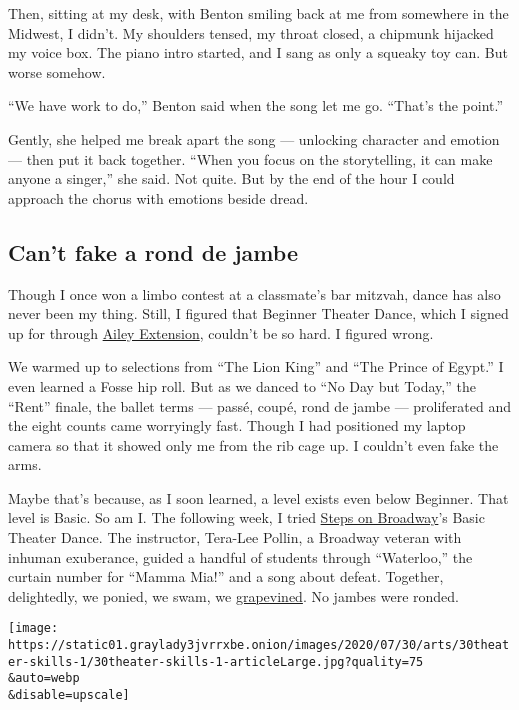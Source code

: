 Then, sitting at my desk, with Benton smiling back at me from somewhere
in the Midwest, I didn't. My shoulders tensed, my throat closed, a
chipmunk hijacked my voice box. The piano intro started, and I sang as
only a squeaky toy can. But worse somehow.

``We have work to do,'' Benton said when the song let me go. ``That's
the point.''

Gently, she helped me break apart the song --- unlocking character and
emotion --- then put it back together. ``When you focus on the
storytelling, it can make anyone a singer,'' she said. Not quite. But by
the end of the hour I could approach the chorus with emotions beside
dread.

\hypertarget{cant-fake-a-rond-de-jambe}{%
\subsection{Can't fake a rond de
jambe}\label{cant-fake-a-rond-de-jambe}}

Though I once won a limbo contest at a classmate's bar mitzvah, dance
has also never been my thing. Still, I figured that Beginner Theater
Dance, which I signed up for through
\href{https://www.aileyextension.com/}{Ailey Extension}, couldn't be so
hard. I figured wrong.

We warmed up to selections from ``The Lion King'' and ``The Prince of
Egypt.'' I even learned a Fosse hip roll. But as we danced to ``No Day
but Today,'' the ``Rent'' finale, the ballet terms --- passé, coupé,
rond de jambe --- proliferated and the eight counts came worryingly
fast. Though I had positioned my laptop camera so that it showed only me
from the rib cage up. I couldn't even fake the arms.

Maybe that's because, as I soon learned, a level exists even below
Beginner. That level is Basic. So am I. The following week, I tried
\href{https://www.stepsnyc.com/}{Steps on Broadway}'s Basic Theater
Dance. The instructor, Tera-Lee Pollin, a Broadway veteran with inhuman
exuberance, guided a handful of students through ``Waterloo,'' the
curtain number for ``Mamma Mia!'' and a song about defeat. Together,
delightedly, we ponied, we swam, we
\href{https://www.youtube.com/watch?v=1BESmZUXIJs}{grapevined}. No
jambes were ronded.

\texttt{[image: https://static01.graylady3jvrrxbe.onion/images/2020/07/30/arts/30theater-skills-1/30theater-skills-1-articleLarge.jpg?quality=75\\\&auto=webp\\\&disable=upscale]}


